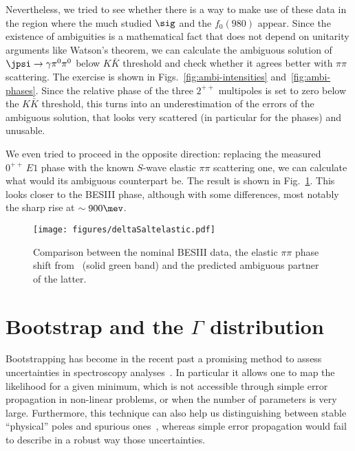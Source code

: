 Nevertheless, we tried to see whether there is a way to make use of these data in the region where the much studied $\sig$ and the $f_0(980)$ appear.
Since the existence of ambiguities is a mathematical fact that does not  depend on unitarity arguments like Watson's theorem, we can calculate the ambiguous solution of $\jpsi \to \gamma \pi^0\pi^0$ below $K\bar K$ threshold and check whether it agrees better with $\pi\pi$ scattering. The exercise is shown in Figs.~\ref{fig:ambi-intensities} and~\ref{fig:ambi-phases}. Since the relative phase of the three $2^{++}$ multipoles is set to zero below the $K \bar K$ threshold, this turns into an underestimation of the errors of the ambiguous solution, that looks very scattered (in particular for the phases) and unusable.

We even tried to proceed in the opposite direction: replacing the measured $0^{++}\,E1$ phase with the known $S$-wave elastic $\pi\pi$ scattering one, we can calculate what would its  ambiguous counterpart be. The result is shown in Fig.~\ref{fig:ambi-phases_new}. This looks closer to the BESIII phase, although with some differences, most notably the sharp rise at $\sim 900\mev$.





\begin{figure}[ht]
{\centering
\texttt{[image: figures/deltaSaltelastic.pdf]}
}
\caption{Comparison between the nominal BESIII data, the elastic $\pi \pi$ phase shift from~\cite{Pelaez:2019eqa} (solid green band) and the predicted ambiguous partner of the latter.}
\label{fig:ambi-phases_new}
\end{figure}



\section{\boldmath Bootstrap and the $\Gamma$ distribution}
\label{app:gamma}

Bootstrapping has become in the recent past a promising method to assess uncertainties in spectroscopy analyses~\cite{Landay:2016cjw,Pilloni:2016obd,JPAC:2017dbi,JPAC:2018zyd,Molina:2020qpw,Niehus:2020gmf,JPAC:2020umo,Bibrzycki:2021rwh}. In particular it allows one to map the likelihood for a given minimum, which is not accessible through simple error propagation in non-linear problems, or when the number of parameters is very large. Furthermore, this technique can also help us distinguishing between stable ``physical'' poles and spurious ones~\cite{JPAC:2018zyd,Fernandez-Ramirez:2019koa}, whereas simple error propagation would fail to describe in a robust way those uncertainties.

